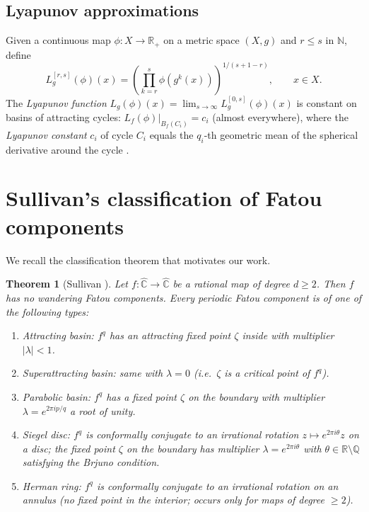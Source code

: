 \documentclass[12pt]{article}
\newtheorem{theorem}{Theorem}[section]
\theoremstyle{definition}
\newcommand{\C}{\mathbb{C}}
\newcommand{\R}{\mathbb{R}}
\newcommand{\N}{\mathbb{N}}
\newcommand{\Q}{\mathbb{Q}}
\newcommand{\Chat}{\hat{\C}}
\begin{document}
\subsection{Lyapunov approximations}

Given a continuous map $\phi: X \to \R_+$ on a metric space $(X,g)$ and
$r \le s$ in $\N$, define
\[
  L_g^{[r,s]}(\phi)(x)
  = \left(\prod_{k=r}^{s} \phi(g^k(x))\right)^{1/(s+1-r)},
  \qquad x \in X.
\]
The \emph{Lyapunov function} $L_g(\phi)(x) = \lim_{s\to\infty}
L_g^{[0,s]}(\phi)(x)$ is constant on basins of attracting cycles:
$L_f(\phi)|_{B_f(C_i)} = c_i$ (almost everywhere), where the \emph{Lyapunov
constant} $c_i$ of cycle $C_i$ equals the $q_i$-th geometric mean of the
spherical derivative around the cycle \cite[Prop.~5]{Alvarez2023}.

\section{Sullivan's classification of Fatou components}
\label{sec:sullivan}

We recall the classification theorem that motivates our work.

\begin{theorem}[Sullivan \cite{Sullivan1983}]
  Let $f:\Chat\to\Chat$ be a rational map of degree $d\ge 2$.  Then $f$
  has no wandering Fatou components.  Every periodic Fatou component is of
  one of the following types:
  \begin{enumerate}[label=(\roman*)]
    \item \emph{Attracting basin}: $f^q$ has an attracting fixed point
          $\zeta$ inside with multiplier $|\lambda|<1$.
    \item \emph{Superattracting basin}: same with $\lambda=0$
          (i.e.~$\zeta$ is a critical point of $f^q$).
    \item \emph{Parabolic basin}: $f^q$ has a fixed point $\zeta$ on the
          boundary with multiplier $\lambda=e^{2\pi ip/q}$ a root of unity.
    \item \emph{Siegel disc}: $f^q$ is conformally conjugate to an
          irrational rotation $z\mapsto e^{2\pi i\theta}z$ on a disc; the
          fixed point $\zeta$ on the boundary has multiplier
          $\lambda=e^{2\pi i\theta}$ with $\theta\in\R\setminus\Q$
          satisfying the Brjuno condition.
    \item \emph{Herman ring}: $f^q$ is conformally conjugate to an
          irrational rotation on an annulus (no fixed point in the interior;
          occurs only for maps of degree $\ge 2$).
  \end{enumerate}
\end{theorem}
\end{document}
